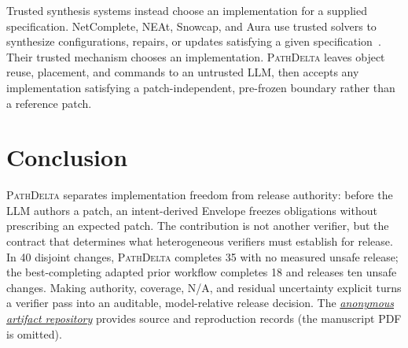 \documentclass[conference]{IEEEtran}
\newcommand{\system}{\textsc{PathDelta}\xspace}
\newcommand{\na}{\textsc{N/A}\xspace}
\begin{document}
Trusted synthesis systems instead choose an implementation for a supplied
specification.  NetComplete, NEAt, Snowcap, and Aura use trusted solvers to
synthesize configurations, repairs, or updates satisfying a
given specification~\cite{elhassany2018netcomplete,zhou2018neat,
schneider2021snowcap,ramanathan2023aura}.  Their trusted mechanism chooses an
implementation.  \system leaves object reuse, placement, and commands to an
untrusted LLM, then accepts any implementation satisfying a patch-independent,
pre-frozen boundary rather than a reference patch.

\section{Conclusion}

\system separates implementation freedom from release authority: before the LLM
authors a patch, an intent-derived Envelope freezes obligations without
prescribing an expected patch.  The contribution is not another verifier, but
the contract that determines what heterogeneous verifiers must establish for
release.  In 40 disjoint changes, \system completes 35 with no measured unsafe
release; the best-completing adapted prior workflow completes 18 and releases ten
unsafe changes.  Making authority, coverage, \na, and residual uncertainty
explicit turns a verifier pass into an auditable, model-relative release
decision.
The \href{https://anonymous.4open.science/r/pathdelta-msn2026-artifact-7998/}{\emph{anonymous artifact repository}} provides source and reproduction records
(the manuscript PDF is omitted).

\renewcommand{\baselinestretch}{0.94}\selectfont
\enlargethispage{2\baselineskip}
\footnotesize


\end{document}
